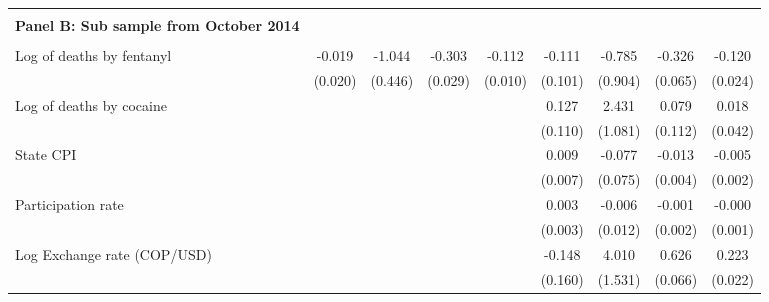 \begin{tabular}{lcccccccc}
 \hline  & & & & &  &  &  &  \\ \textbf{Panel B: Sub sample from October 2014} \\ & & & & & & & & \\
Log of deaths by fentanyl&      -0.019         &      -1.044\sym{*}  &      -0.303\sym{***}&      -0.112\sym{***}&      -0.111         &      -0.785         &      -0.326\sym{***}&      -0.120\sym{***}\\
                    &     (0.020)         &     (0.446)         &     (0.029)         &     (0.010)         &     (0.101)         &     (0.904)         &     (0.065)         &     (0.024)         \\
\addlinespace
Log of deaths by cocaine&                     &                     &                     &                     &       0.127         &       2.431\sym{*}  &       0.079         &       0.018         \\
                    &                     &                     &                     &                     &     (0.110)         &     (1.081)         &     (0.112)         &     (0.042)         \\
\addlinespace
State CPI           &                     &                     &                     &                     &       0.009         &      -0.077         &      -0.013\sym{**} &      -0.005\sym{**} \\
                    &                     &                     &                     &                     &     (0.007)         &     (0.075)         &     (0.004)         &     (0.002)         \\
\addlinespace
Participation rate  &                     &                     &                     &                     &       0.003         &      -0.006         &      -0.001         &      -0.000         \\
                    &                     &                     &                     &                     &     (0.003)         &     (0.012)         &     (0.002)         &     (0.001)         \\
\addlinespace
Log Exchange rate (COP/USD)&                     &                     &                     &                     &      -0.148         &       4.010\sym{**} &       0.626\sym{***}&       0.223\sym{***}\\
                    &                     &                     &                     &                     &     (0.160)         &     (1.531)         &     (0.066)         &     (0.022)         \\

\end{tabular}
